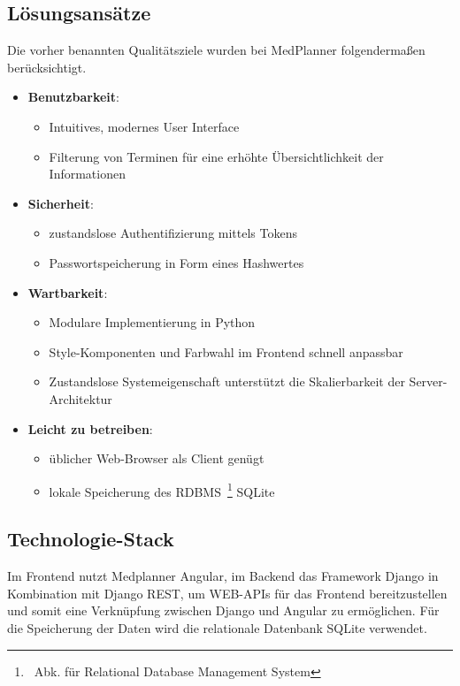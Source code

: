 \documentclass[conference]{IEEEtran}
\begin{document}
\subsection{Lösungsansätze}
Die vorher benannten Qualitätsziele wurden bei MedPlanner folgendermaßen berücksichtigt.
\begin{itemize}
	\item \textbf{Benutzbarkeit}:
	\begin{itemize}
		\item Intuitives, modernes User Interface
		\item Filterung von Terminen für eine erhöhte Übersichtlichkeit der Informationen
	\end{itemize}
	\pagebreak
	\item \textbf{Sicherheit}:
	\begin{itemize}
		\item zustandslose Authentifizierung mittels Tokens
		\item Passwortspeicherung in Form eines Hashwertes
	\end{itemize}
	\item \textbf{Wartbarkeit}:
	\begin{itemize}
		\item Modulare Implementierung in Python
		\item Style-Komponenten und Farbwahl im Frontend schnell anpassbar
		\item Zustandslose Systemeigenschaft unterstützt die Skalierbarkeit der Server-Architektur
	\end{itemize}
	\item \textbf{Leicht zu betreiben}:
	\begin{itemize}
		\item üblicher Web-Browser als Client genügt
		\item lokale Speicherung des RDBMS~\footnote{~Abk. für Relational Database Management System} SQLite
	\end{itemize}	
\end{itemize}

\subsection{Technologie-Stack}
Im Frontend nutzt Medplanner Angular, im Backend das Framework Django in Kombination mit Django REST, um WEB-APIs für das Frontend bereitzustellen und somit eine Verknüpfung zwischen Django und Angular zu ermöglichen. Für die Speicherung der Daten wird die relationale Datenbank SQLite verwendet. 
\end{document}
